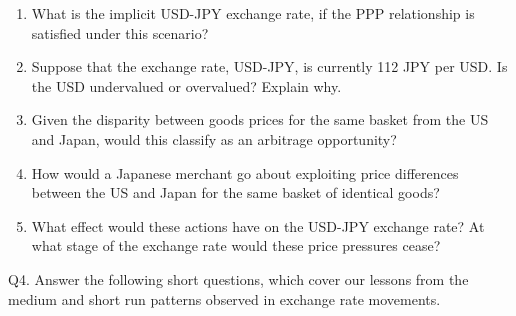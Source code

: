 \documentclass[12pt]{article}
\begin{document}
\begin{enumerate}[1)]
	\item What is the implicit USD-JPY exchange rate, if the PPP relationship is satisfied under this scenario?
	
	\newpage
	
	\item Suppose that the exchange rate, USD-JPY, is currently 112 JPY per USD. Is the USD undervalued or overvalued? Explain why.
	
	\vspace{1.5in}
	
	\item Given the disparity between goods prices for the same basket from the US and Japan, would this classify as an arbitrage opportunity?  
	
	
	\vspace{1.5in}
	
	\item How would a Japanese merchant go about exploiting price differences between the US and Japan for the same basket of identical goods?
	
	\vspace{1.5in}
	
	
	\item What effect would these actions have on the USD-JPY exchange rate? At what stage of the exchange rate would these price pressures cease?
	
	\vspace{1.5in}
	
\end{enumerate}

\noindent Q4. Answer the following short questions, which cover our lessons from the medium and short run patterns observed in exchange rate movements.
\end{document}
